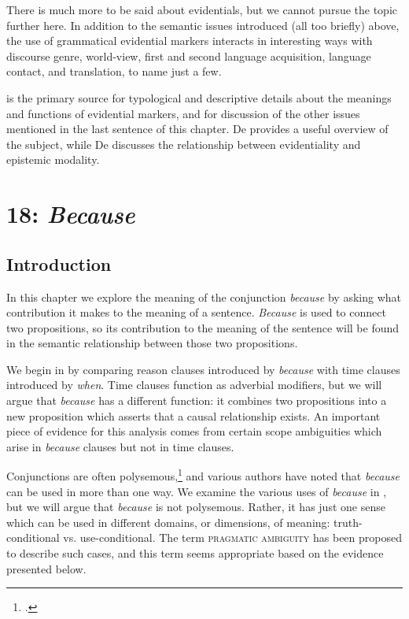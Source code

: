 There is much more to be said about evidentials, but we cannot pursue the topic further here. In addition to the semantic issues introduced (all too briefly) above, the use of grammatical evidential markers interacts in interesting ways with discourse genre, world-view, first and second language acquisition, language contact, and translation, to name just a few.



\furtherreading



\citet{Aikhenvald2004} is the primary source for typological and descriptive details about the meanings and functions of evidential markers, and for discussion of the other issues mentioned in the last sentence of this chapter. De \citet{Haan2012} provides a useful overview of the subject, while De \citet{Haan1999,Haan2005} discusses the relationship between evidentiality and epistemic modality.


\chapter{{18}: \textit{Because}}

\section{Introduction}\label{sec:} %

In this chapter we explore the meaning of the conjunction \textit{because} by asking what contribution it makes to the meaning of a sentence. \textit{Because} is used to connect two propositions, so its contribution to the meaning of the sentence will be found in the semantic relationship between those two propositions.



We begin in  by comparing reason clauses introduced by \textit{because} with time clauses introduced by \textit{when}. Time clauses function as adverbial modifiers, but we will argue that \textit{because} has a different function: it combines two propositions into a new proposition which asserts that a causal relationship exists. An important piece of evidence for this analysis comes from certain scope ambiguities which arise in \textit{because} clauses but not in time clauses.



Conjunctions are often polysemous,\footnote{\citet{Aikhenvald2009}.} and various authors have noted that \textit{because} can be used in more than one way. We examine the various uses of \textit{because} in , but we will argue that \textit{because} is not polysemous. Rather, it has just one sense which can be used in different domains, or dimensions, of meaning: truth-conditional vs. use-conditional. The term \textsc{pragmatic ambiguity} has been proposed to describe such cases, and this term seems appropriate based on the evidence presented below.



